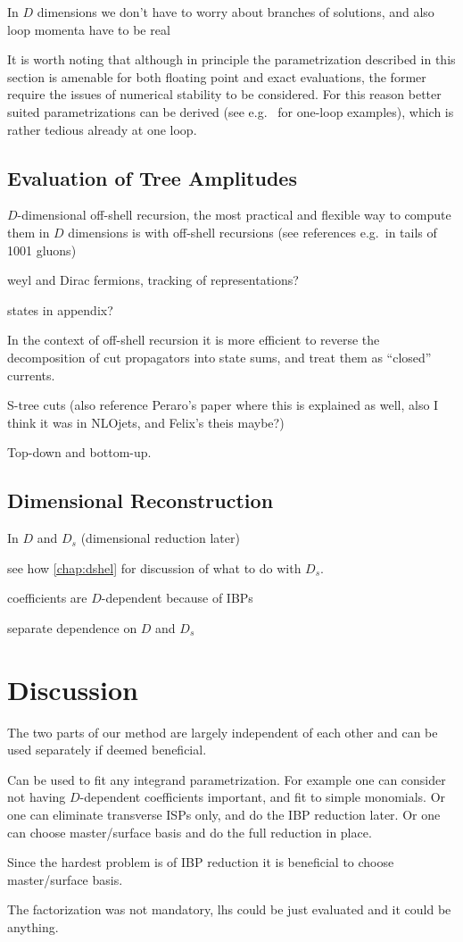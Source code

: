 In $D$ dimensions we don't have to worry about branches of solutions, 
and also loop momenta have to be real


It is worth noting that although in principle the parametrization described in this
section is amenable for both floating point and exact evaluations,
the former require the issues of numerical stability to be considered.
For this reason better suited parametrizations can be derived (see e.g.\ \cite{Kilgore:2007qr,Berger:2008sj} for one-loop examples),
which is rather tedious already at one loop.



\subsection{Evaluation of Tree Amplitudes}
$D$-dimensional off-shell recursion,
the most practical and flexible way to compute them in $D$ dimensions is with off-shell recursions (see references e.g.\ in tails of 1001 gluons)

weyl and Dirac fermions,
tracking of representations?

states in appendix?

In the context of off-shell recursion it is more efficient to reverse
the decomposition of cut propagators into state sums, and treat them
as ``closed'' currents.

 
S-tree cuts (also reference Peraro's paper where this is explained as well, also I think it was in NLOjets, and Felix's theis maybe?)

Top-down and bottom-up.


\subsection{Dimensional Reconstruction}
 In $D$ and $D_s$ (dimensional reduction later)

see how \cref{chap:dshel} for discussion of what to do with $D_s$.

coefficients are $D$-dependent because of IBPs

separate dependence on $D$ and $D_s$




\section{Discussion}
The two parts of our method are largely independent of each other and can be used separately if deemed beneficial.

Can be used to fit any integrand parametrization. 
For example one can consider not having $D$-dependent coefficients important, and fit to simple monomials.
Or one can eliminate transverse ISPs only, and do the IBP reduction later.
Or one can choose master/surface basis and do the full reduction in place.

Since the hardest problem is of IBP reduction it is beneficial to choose master/surface basis.

The factorization was not mandatory, lhs could be just evaluated and it could be anything.



